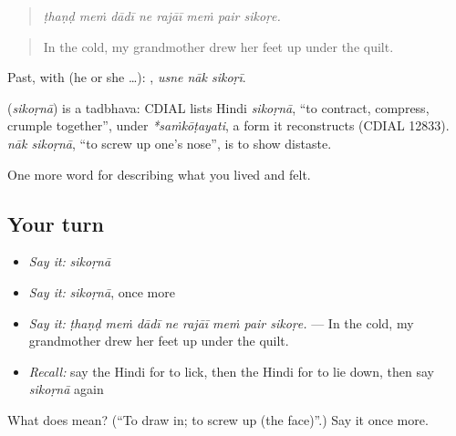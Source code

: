 \begin{quote}
       
\end{quote}

\begin{quote}
\emph{ṭhaṇḍ meṁ dādī ne rajāī meṁ pair sikoṛe.}
\end{quote}

\begin{quote}
In the cold, my grandmother drew her feet up under the quilt.
\end{quote}

Past, with  (he or she …):   , \emph{usne nāk sikoṛī}.

\begin{cousinweb}
\textbf{} (\emph{sikoṛnā}) is a tadbhava: CDIAL lists Hindi \emph{sikoṛnā}, \textquotedblleft{}to contract, compress, crumple together\textquotedblright{}, under \emph{*saṁkōṭayati}, a form it reconstructs (CDIAL 12833). \emph{nāk sikoṛnā}, \textquotedblleft{}to screw up one's nose\textquotedblright{}, is to show distaste.
\end{cousinweb}

\begin{grammarlens}[title={What you've built}]
One more word for describing what you lived and felt.
\end{grammarlens}

\subsection*{Your turn}
\begin{itemize}
\raggedright
  \item \emph{Say it:} \emph{sikoṛnā}
  \item \emph{Say it:} \emph{sikoṛnā}, once more
  \item \emph{Say it:} \emph{ṭhaṇḍ meṁ dādī ne rajāī meṁ pair sikoṛe.} — In the cold, my grandmother drew her feet up under the quilt.
  \item \emph{Recall:} say the Hindi for to lick, then the Hindi for to lie down, then say \emph{sikoṛnā} again
\end{itemize}

\begin{tcolorbox}[breakable,colback=teal!4,colframe=teal!35!black,title={Before you move on}]
What does  mean? (\textquotedblleft{}To draw in; to screw up (the face)\textquotedblright{}.) Say it once more.
\end{tcolorbox}
